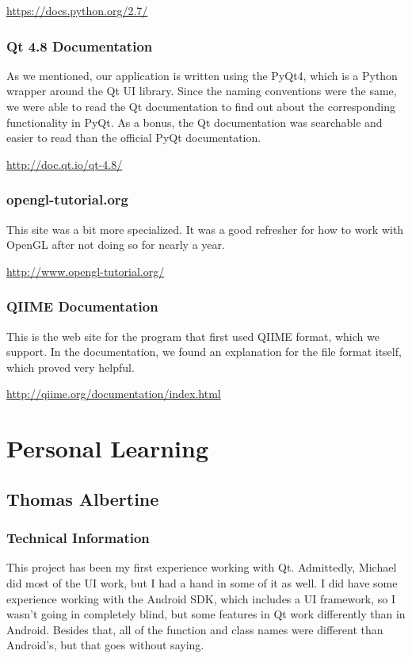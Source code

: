 \documentclass[letterpaper,10pt, onecolumn, draftclsnofoot]{IEEEtran}
\begin{document}
\url{https://docs.python.org/2.7/}

\subsubsection{Qt 4.8 Documentation}
As we mentioned, our application is written using the PyQt4, which is a Python wrapper around the Qt UI library. Since the naming conventions were the same, we were able to read the Qt documentation to find out about the corresponding functionality in PyQt. As a bonus, the Qt documentation was searchable and easier to read than the official PyQt documentation.

\url{http://doc.qt.io/qt-4.8/}

\subsubsection{opengl-tutorial.org}
This site was a bit more specialized. It was a good refresher for how to work with OpenGL after not doing so for nearly a year. 

\url{http://www.opengl-tutorial.org/}

\subsubsection{QIIME Documentation}
This is the web site for the program that first used QIIME format, which we support. In the documentation, we found an explanation for the file format itself, which proved very helpful.

\url{http://qiime.org/documentation/index.html}

\section{Personal Learning}
\subsection{Thomas Albertine}
\subsubsection{Technical Information}
This project has been my first experience working with Qt. Admittedly, Michael did most of the UI work, but I had a hand in some of it as well. I did have some experience working with the Android SDK, which includes a UI framework, so I wasn't going in completely blind, but some features in Qt work differently than in Android. Besides that, all of the function and class names were different than Android's, but that goes without saying.
\end{document}
